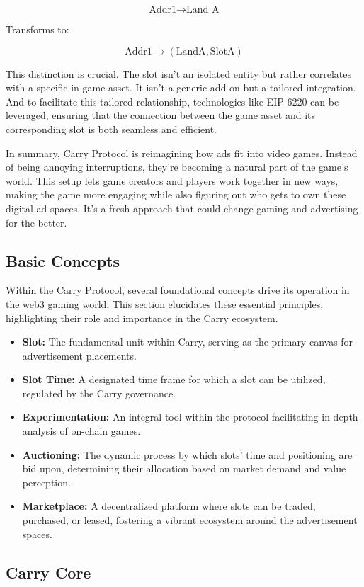 \[\text{Addr1} \rightarrow \text{Land A}\]

Transforms to:

\[\text{Addr1} \rightarrow (\text{LandA}, \text{SlotA})\]

This distinction is crucial. The slot isn't an isolated entity but rather correlates with a specific in-game asset. It isn't a generic add-on but a tailored integration. And to facilitate this tailored relationship, technologies like EIP-6220 can be leveraged, ensuring that the connection between the game asset and its corresponding slot is both seamless and efficient.

In summary, Carry Protocol is reimagining how ads fit into video games. Instead of being annoying interruptions, they're becoming a natural part of the game's world. This setup lets game creators and players work together in new ways, making the game more engaging while also figuring out who gets to own these digital ad spaces. It's a fresh approach that could change gaming and advertising for the better.

\subsection{Basic Concepts}
Within the Carry Protocol, several foundational concepts drive its operation in the web3 gaming world. This section elucidates these essential principles, highlighting their role and importance in the Carry ecosystem.
\begin{itemize}
    \item \textbf{Slot:} The fundamental unit within Carry, serving as the primary canvas for advertisement placements.
    \item \textbf{Slot Time:} A designated time frame for which a slot can be utilized, regulated by the Carry governance.
    \item \textbf{Experimentation:} An integral tool within the protocol facilitating in-depth analysis of on-chain games.
    \item \textbf{Auctioning:} The dynamic process by which slots' time and positioning are bid upon, determining their allocation based on market demand and value perception.
    \item \textbf{Marketplace:} A decentralized platform where slots can be traded, purchased, or leased, fostering a vibrant ecosystem around the advertisement spaces.
\end{itemize}

\subsection{Carry Core}

